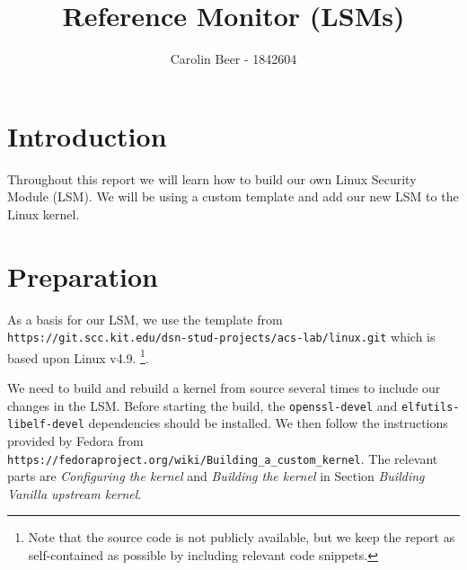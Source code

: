 \documentclass{semdoc}
\begin{document}

%
\title{Reference Monitor (LSMs)}
%
\author{Carolin Beer - 1842604}


%
%
\maketitle

\section{Introduction}
Throughout this report we will learn how to build our own Linux Security Module (LSM). We will be using a custom template and add our new LSM to the Linux kernel.

\section{Preparation}
As a basis for our LSM, we use the template from \texttt{https://git.scc.kit.edu/dsn-stud-projects/acs-lab/linux.git} which is based upon Linux v4.9.
\footnote{Note that the source code is not publicly available, but we keep the report as self-contained as possible by including relevant code snippets.}.

We need to build and rebuild a kernel from source several times to include our changes in the LSM. 
Before starting the build, the \texttt{openssl-devel} and \texttt{elfutils-libelf-devel} dependencies should be installed.
We then follow the instructions provided by Fedora from \texttt{https://fedoraproject.org/wiki/Building\_a\_custom\_kernel}. 
The relevant parts are \emph{Configuring the kernel} and \emph{Building the kernel} in Section \emph{Building Vanilla upstream kernel}. 
\end{document}
